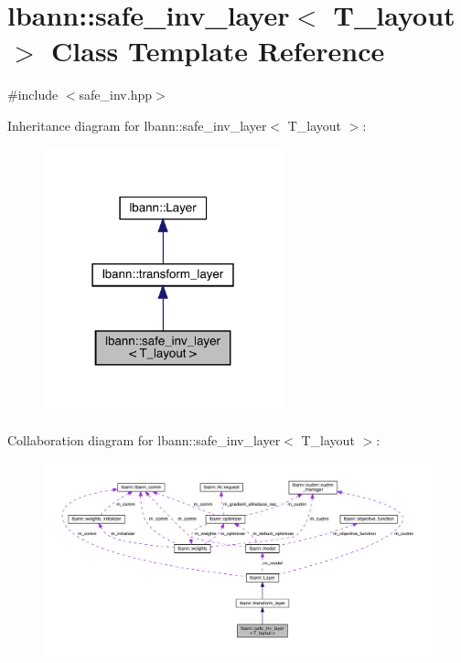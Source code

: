 \hypertarget{classlbann_1_1safe__inv__layer}{}\section{lbann\+:\+:safe\+\_\+inv\+\_\+layer$<$ T\+\_\+layout $>$ Class Template Reference}
\label{classlbann_1_1safe__inv__layer}


{\ttfamily \#include $<$safe\+\_\+inv.\+hpp$>$}



Inheritance diagram for lbann\+:\+:safe\+\_\+inv\+\_\+layer$<$ T\+\_\+layout $>$\+:\nopagebreak
\begin{figure}[H]
\begin{center}
\leavevmode
\includegraphics[width=195pt]{classlbann_1_1safe__inv__layer__inherit__graph}
\end{center}
\end{figure}


Collaboration diagram for lbann\+:\+:safe\+\_\+inv\+\_\+layer$<$ T\+\_\+layout $>$\+:\nopagebreak
\begin{figure}[H]
\begin{center}
\leavevmode
\includegraphics[width=350pt]{classlbann_1_1safe__inv__layer__coll__graph}
\end{center}
\end{figure}
